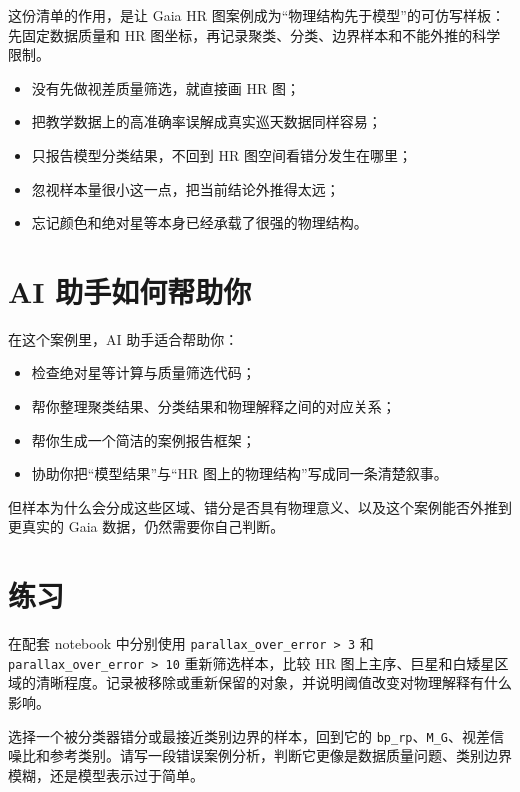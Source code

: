 这份清单的作用，是让 Gaia HR 图案例成为“物理结构先于模型”的可仿写样板：先固定数据质量和 HR 图坐标，再记录聚类、分类、边界样本和不能外推的科学限制。

\begin{warnbox}[这个案例中的常见误区]
\begin{itemize}
    \item 没有先做视差质量筛选，就直接画 HR 图；
    \item 把教学数据上的高准确率误解成真实巡天数据同样容易；
    \item 只报告模型分类结果，不回到 HR 图空间看错分发生在哪里；
    \item 忽视样本量很小这一点，把当前结论外推得太远；
    \item 忘记颜色和绝对星等本身已经承载了很强的物理结构。
\end{itemize}
\end{warnbox}

\section{AI 助手如何帮助你}

在这个案例里，AI 助手适合帮助你：

\begin{itemize}
    \item 检查绝对星等计算与质量筛选代码；
    \item 帮你整理聚类结果、分类结果和物理解释之间的对应关系；
    \item 帮你生成一个简洁的案例报告框架；
    \item 协助你把“模型结果”与“HR 图上的物理结构”写成同一条清楚叙事。
\end{itemize}

但样本为什么会分成这些区域、错分是否具有物理意义、以及这个案例能否外推到更真实的 Gaia 数据，仍然需要你自己判断。

\section{练习}

\begin{exercisebox}[基础练习]
在配套 notebook 中分别使用 \texttt{parallax\_over\_error > 3} 和 \texttt{parallax\_over\_error > 10} 重新筛选样本，比较 HR 图上主序、巨星和白矮星区域的清晰程度。记录被移除或重新保留的对象，并说明阈值改变对物理解释有什么影响。
\end{exercisebox}

\begin{exercisebox}[进阶练习]
选择一个被分类器错分或最接近类别边界的样本，回到它的 \texttt{bp\_rp}、\texttt{M\_G}、视差信噪比和参考类别。请写一段错误案例分析，判断它更像是数据质量问题、类别边界模糊，还是模型表示过于简单。
\end{exercisebox}


